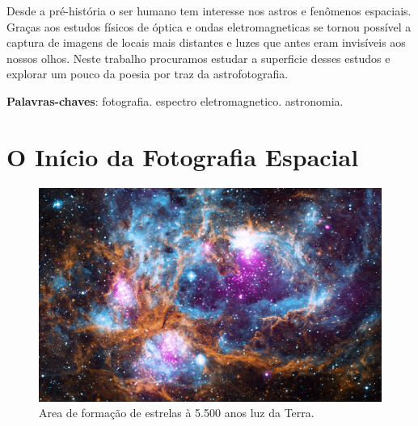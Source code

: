 \documentclass[
	article,			%
	12pt,				%
	oneside,			%
	a4paper,			%
	english,			%
	brazil,				%
	sumario=tradicional
	]{abntex2}
\begin{document}
\frenchspacing 


%
%
\maketitle

\begin{resumoumacoluna}
Desde a pré-história o ser humano tem interesse nos astros e fenômenos
espaciais. Graças aos estudos físicos de óptica e ondas eletromagneticas se
tornou possível a captura de imagens de locais mais distantes e luzes que antes
eram invisíveis aos nossos olhos. Neste trabalho procuramos estudar a
superficie desses estudos e explorar um pouco da poesia por traz da
astrofotografia.

 \vspace{\onelineskip}
 
 \noindent
 \textbf{Palavras-chaves}: fotografia. espectro eletromagnetico. astronomia.
\end{resumoumacoluna}

\textual{}

\section{O Início da Fotografia Espacial}
\label{start}

\begin{figure}[ht]
	\includegraphics[width=\linewidth]{img/ngc6357_big.jpg}
	\caption{Area de formação de estrelas à 5.500 anos luz da Terra.}
	\label{fig:starformation}
	\centering
\end{figure}
\end{document}
